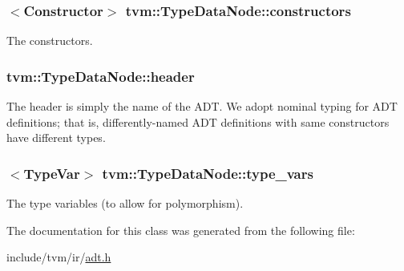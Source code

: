\subsubsection[{\texorpdfstring{constructors}{constructors}}]{$<${\bf Constructor}$>$ tvm\+::\+Type\+Data\+Node\+::constructors}\hypertarget{classtvm_1_1TypeDataNode_a4b8e6e09856e514b91586223d48fd117}{}\label{classtvm_1_1TypeDataNode_a4b8e6e09856e514b91586223d48fd117}


The constructors. 

\subsubsection[{\texorpdfstring{header}{header}}]{ tvm\+::\+Type\+Data\+Node\+::header}\hypertarget{classtvm_1_1TypeDataNode_a2fe297fe22375fbc180deb003d142ab9}{}\label{classtvm_1_1TypeDataNode_a2fe297fe22375fbc180deb003d142ab9}


The header is simply the name of the A\+DT. We adopt nominal typing for A\+DT definitions; that is, differently-\/named A\+DT definitions with same constructors have different types. 

\subsubsection[{\texorpdfstring{type\+\_\+vars}{type_vars}}]{$<${\bf Type\+Var}$>$ tvm\+::\+Type\+Data\+Node\+::type\+\_\+vars}\hypertarget{classtvm_1_1TypeDataNode_a350a23efc88be1def5b93d27ac6fa88b}{}\label{classtvm_1_1TypeDataNode_a350a23efc88be1def5b93d27ac6fa88b}


The type variables (to allow for polymorphism). 



The documentation for this class was generated from the following file\+:\begin{DoxyCompactItemize}
\item 
include/tvm/ir/\hyperlink{ir_2adt_8h}{adt.\+h}\end{DoxyCompactItemize}
